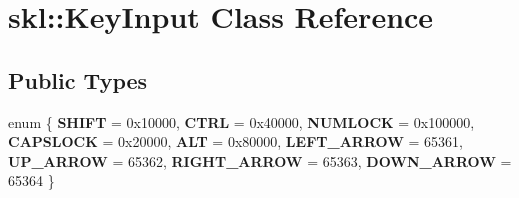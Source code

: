 \hypertarget{classskl_1_1_key_input}{}\section{skl\+:\+:Key\+Input Class Reference}
\label{classskl_1_1_key_input}
\subsection*{Public Types}
\begin{DoxyCompactItemize}
\item 
\hypertarget{classskl_1_1_key_input_a3041907e37053b075d2204f07e790cbb}{}\label{classskl_1_1_key_input_a3041907e37053b075d2204f07e790cbb} 
enum \{ \newline
{\bfseries S\+H\+I\+FT} = 0x10000, 
{\bfseries C\+T\+RL} = 0x40000, 
{\bfseries N\+U\+M\+L\+O\+CK} = 0x100000, 
{\bfseries C\+A\+P\+S\+L\+O\+CK} = 0x20000, 
\newline
{\bfseries A\+LT} = 0x80000, 
{\bfseries L\+E\+F\+T\+\_\+\+A\+R\+R\+OW} = 65361, 
{\bfseries U\+P\+\_\+\+A\+R\+R\+OW} = 65362, 
{\bfseries R\+I\+G\+H\+T\+\_\+\+A\+R\+R\+OW} = 65363, 
\newline
{\bfseries D\+O\+W\+N\+\_\+\+A\+R\+R\+OW} = 65364
 \}
\end{DoxyCompactItemize}
